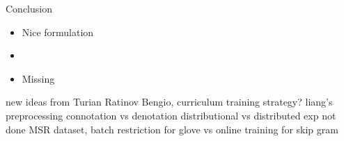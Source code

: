\begin{frame}{Conclusion}
  \begin{itemize}
  \item Nice formulation
  \item 
  \item Missing 
  \end{itemize}
  new ideas from Turian Ratinov Bengio,
  curriculum training strategy?
  liang's preprocessing
  connotation vs denotation
  distributional vs distributed
  exp not done MSR dataset,
  batch restriction for glove vs online training for skip gram
\end{frame}
